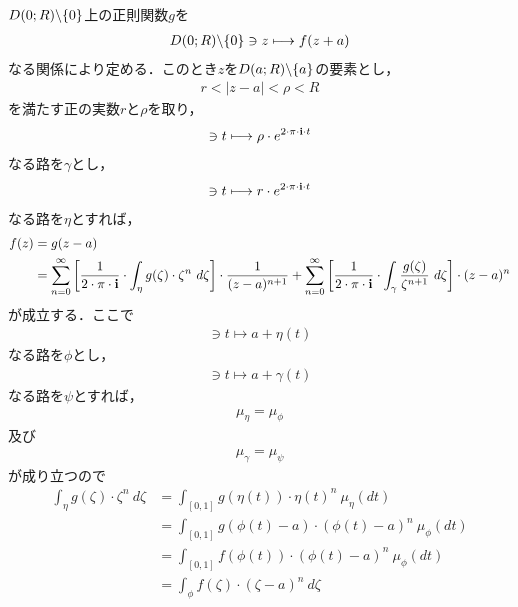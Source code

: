 	\begin{sketch}
		$D(0;R) \backslash \{0\}$上の正則関数$g$を
		\begin{align}
			D(0;R) \backslash \{0\} \ni z \longmapsto f(z+a)
		\end{align}
		なる関係により定める．このとき$z$を$D(a;R) \backslash \{a\}$の要素とし，
		\begin{align}
			r < |z-a| < \rho < R
		\end{align}
		を満たす正の実数$r$と$\rho$を取り，
		\begin{align}
			[0,1] \ni t \longmapsto \rho \cdot e^{2 \cdot \pi \cdot \isym \cdot t}
		\end{align}
		なる路を$\gamma$とし，
		\begin{align}
			[0,1] \ni t \longmapsto r \cdot e^{2 \cdot \pi \cdot \isym \cdot t}
		\end{align}
		なる路を$\eta$とすれば，
		\begin{align}
			f(z) &= g(z-a) \\
			&= \sum_{n=0}^{\infty} \left[ \frac{1}{2\cdot\pi\cdot\mathbf{i}} \cdot \int_{\eta} g(\zeta) \cdot \zeta^{n}\ d\zeta \right] \cdot \frac{1}{(z-a)^{n+1}}
			+ \sum_{n=0}^{\infty} \left[ \frac{1}{2\cdot\pi\cdot\mathbf{i}} \cdot \int_{\gamma} \frac{g(\zeta)}{\zeta^{n+1}}\ d\zeta \right] \cdot (z-a)^{n}
		\end{align}
		が成立する．ここで
		\begin{align}
			[0,1] \ni t \longmapsto a + \eta(t)
		\end{align}
		なる路を$\phi$とし，
		\begin{align}
			[0,1] \ni t \longmapsto a + \gamma(t)
		\end{align}
		なる路を$\psi$とすれば，
		\begin{align}
			\mu_{\eta} = \mu_{\phi}
		\end{align}
		及び
		\begin{align}
			\mu_{\gamma} = \mu_{\psi}
		\end{align}
		が成り立つので
		\begin{align}
			\int_{\eta} g(\zeta) \cdot \zeta^{n}\ d\zeta
			&= \int_{[0,1]} g(\eta(t)) \cdot \eta(t)^{n}\ \mu_{\eta}(dt) \\
			&= \int_{[0,1]} g(\phi(t)-a) \cdot (\phi(t)-a)^{n}\ \mu_{\phi}(dt) \\
			&= \int_{[0,1]} f(\phi(t)) \cdot (\phi(t)-a)^{n}\ \mu_{\phi}(dt) \\
			&= \int_{\phi} f(\zeta) \cdot (\zeta-a)^{n}\ d\zeta
		\end{align}

\end{sketch}
